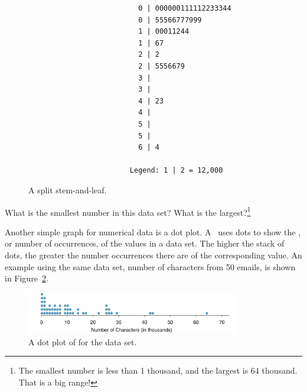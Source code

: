 \begin{figure}[h]
\begin{verbatim}
                          0 | 000000111112233344
                          0 | 55566777999
                          1 | 00011244
                          1 | 67
                          2 | 2
                          2 | 5556679
                          3 |
                          3 |
                          4 | 23
                          4 |
                          5 |
                          5 |
                          6 | 4

                        Legend: 1 | 2 = 12,000
\end{verbatim}
\caption{A split stem-and-leaf.}
\label{splitstemandleaf50email}
\end{figure}

\begin{exercise}
What is the smallest number in this data set? What is the largest?\footnote{The smallest number is less than 1 thousand, and the largest is 64 thousand. That is a big range!}
\end{exercise}


Another simple graph for numerical data is a dot plot. A~ uses dots to show the , or number of occurrences, of the values in a data set. The higher the stack of dots, the greater the number occurrences there are of the corresponding value. An example using the same data set, number of characters from 50 emails, is shown in Figure~\ref{emailCharactersDotPlotStacked}.

\begin{figure}[h]
   \centering
   \includegraphics[width=0.825\textwidth]{ch_summarizing_data/figures/emailCharactersDotPlot/emailCharactersDotPlotStackedRounded}
   \caption{A dot plot of  for the  data set.}
   \label{emailCharactersDotPlotStacked}
\end{figure}

